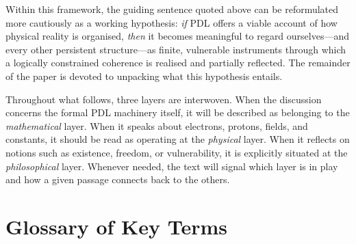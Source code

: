 \documentclass[11pt,a4paper]{article}
\theoremstyle{definition}
\begin{document}
Within this framework, the guiding sentence quoted above can be reformulated more cautiously as a working hypothesis: \emph{if} PDL offers a viable account of how physical reality is organised, \emph{then} it becomes meaningful to regard ourselves---and every other persistent structure---as finite, vulnerable instruments through which a logically constrained coherence is realised and partially reflected. The remainder of the paper is devoted to unpacking what this hypothesis entails.

Throughout what follows, three layers are interwoven. When the discussion concerns the formal PDL machinery itself, it will be described as belonging to the \emph{mathematical} layer. When it speaks about electrons, protons, fields, and constants, it should be read as operating at the \emph{physical} layer. When it reflects on notions such as existence, freedom, or vulnerability, it is explicitly situated at the \emph{philosophical} layer. Whenever needed, the text will signal which layer is in play and how a given passage connects back to the others.

\section*{Glossary of Key Terms}
\end{document}
